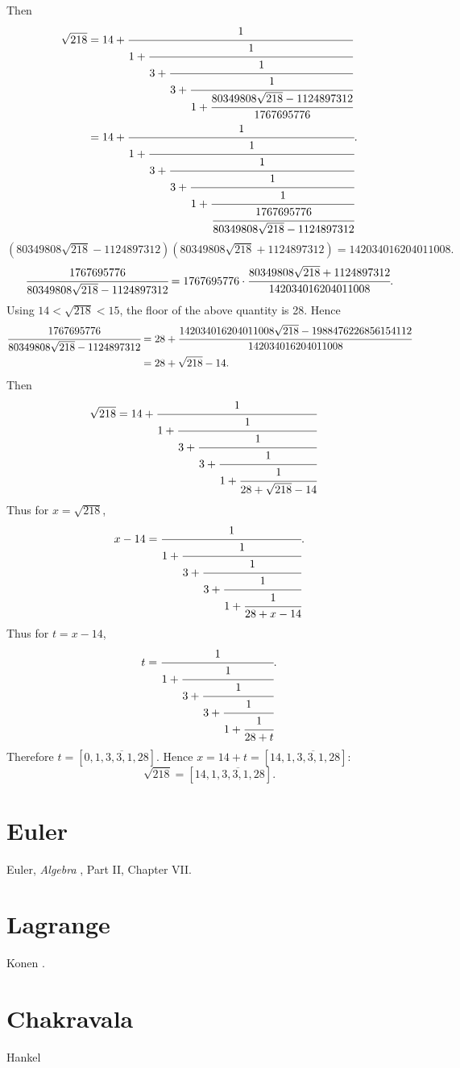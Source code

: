 \documentclass{article}
\theoremstyle{definition}
\theoremstyle{definition}
\begin{document}
Then
\begin{align*}
\sqrt{218} &= 
14+\cfrac{1}{1 + \cfrac{1}{3 + \cfrac{1}{3+\cfrac{1}{1
+\cfrac{80349808 \sqrt{218} -1124897312}{1767695776}}}}}\\
&=14+\cfrac{1}{1 + \cfrac{1}{3 + \cfrac{1}{3+\cfrac{1}{1
+\cfrac{1}{\cfrac{1767695776}{80349808 \sqrt{218} -1124897312}}}}}}.
\end{align*}
\[
(80349808 \sqrt{218} -1124897312)(80349808 \sqrt{218} +1124897312)=142034016204011008.
\]
\[
\cfrac{1767695776}{80349808 \sqrt{218} -1124897312} = 1767695776 \cdot \cfrac{80349808 \sqrt{218} +1124897312}{142034016204011008}.
\]
Using $14<\sqrt{218}<15$, the floor of the above quantity is 28. Hence
\begin{align*}
\cfrac{1767695776}{80349808 \sqrt{218} -1124897312}&=28 + \cfrac{142034016204011008 \sqrt{218} -1988476226856154112}{142034016204011008}\\
&=28+\sqrt{218}-14.
\end{align*}
Then
\begin{align*}
\sqrt{218}&=14+\cfrac{1}{1 + \cfrac{1}{3 + \cfrac{1}{3+\cfrac{1}{1
+\cfrac{1}{28+\sqrt{218}-14}}}}}
\end{align*}
Thus for $x=\sqrt{218}$,
\[
x-14 = \cfrac{1}{1 + \cfrac{1}{3 + \cfrac{1}{3+\cfrac{1}{1
+\cfrac{1}{28+x-14}}}}}.
\]
Thus for $t=x-14$,
\[
t = \cfrac{1}{1 + \cfrac{1}{3 + \cfrac{1}{3+\cfrac{1}{1
+\cfrac{1}{28+t}}}}}.
\]
Therefore $t=[0,\overline{1,3,3,1,28}]$.
Hence $x=14+t=[14,\overline{1,3,3,1,28}]$:
\[
\sqrt{218} = [14,\overline{1,3,3,1,28}].
\]




\section{Euler}
Euler, {\em Algebra} \cite{algebra}, Part II, Chapter VII.



\section{Lagrange}
Konen \cite[pp.~75--77]{konen}.







\section{Chakravala}
Hankel \cite[pp.~200--203]{hankel}
\end{document}
